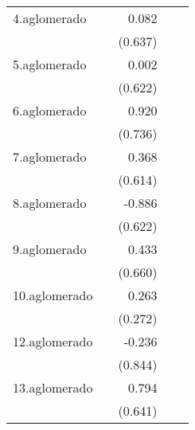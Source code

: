 {\begin{longtable}{l*{4}{D{.}{.}{-1}}}
\addlinespace
4.aglomerado&                     &       0.082         &                     &                     \\
            &                     &     (0.637)         &                     &                     \\
\addlinespace
5.aglomerado&                     &       0.002         &                     &                     \\
            &                     &     (0.622)         &                     &                     \\
\addlinespace
6.aglomerado&                     &       0.920         &                     &                     \\
            &                     &     (0.736)         &                     &                     \\
\addlinespace
7.aglomerado&                     &       0.368         &                     &                     \\
            &                     &     (0.614)         &                     &                     \\
\addlinespace
8.aglomerado&                     &      -0.886         &                     &                     \\
            &                     &     (0.622)         &                     &                     \\
\addlinespace
9.aglomerado&                     &       0.433         &                     &                     \\
            &                     &     (0.660)         &                     &                     \\
\addlinespace
10.aglomerado&                     &       0.263         &                     &                     \\
            &                     &     (0.272)         &                     &                     \\
\addlinespace
12.aglomerado&                     &      -0.236         &                     &                     \\
            &                     &     (0.844)         &                     &                     \\
\addlinespace
13.aglomerado&                     &       0.794         &                     &                     \\
            &                     &     (0.641)         &                     &                     \\

\end{longtable}}
